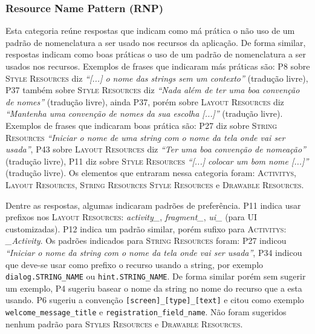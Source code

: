 \subsubsection{Resource Name Pattern (RNP)}
Esta categoria re\'une respostas que indicam como m\'a pr\'atica o n\~ao uso de um padr\~ao de nomenclatura a ser usado nos recursos da aplica\c{c}\~ao. De forma similar, respostas indicam como boas pr\'aticas o uso de um padr\~ao de nomenclatura a ser usados nos recursos. Exemplos de frases que indicaram m\'as pr\'aticas s\~ao: P8 sobre \textsc{Style Resources} diz \textit{``[...] o nome das strings sem um contexto''} (tradu\c{c}\~ao livre), P37 tamb\'em sobre \textsc{Style Resources} diz \textit{``Nada al\'em de ter uma boa conven\c{c}\~ao de nomes''} (tradu\c{c}\~ao livre), ainda P37, por\'em sobre \textsc{Layout Resources} diz \textit{``Mantenha uma conven\c{c}\~ao de nomes da sua escolha [...]''} (tradu\c{c}\~ao livre). Exemplos de frases que indicaram boas pr\'atica s\~ao: P27 diz sobre \textsc{String Resources} \textit{``Iniciar o nome de uma string com o nome da tela onde vai ser usada''}, P43 sobre \textsc{Layout Resources} diz \textit{``Ter uma boa conven\c{c}\~ao de nomea\c{c}\~ao''} (tradu\c{c}\~ao livre), P11 diz sobre \textsc{Style Resources} \textit{``[...] colocar um bom nome [...]''} (tradu\c{c}\~ao livre). Os elementos que entraram nessa categoria foram: \textsc{Activitys}, \textsc{Layout Resources}, \textsc{String Resources} \textsc{Style Resources} e \textsc{Drawable Resources}. 

Dentre as respostas, algumas indicaram padr\~oes de prefer\^encia. P11 indica usar prefixos nos \textsc{Layout Resources}: \textit{activity\_}, \textit{fragment\_}, \textit{ui\_} (para UI customizadas). P12 indica um padr\~ao similar, por\'em sufixo para \textsc{Activitys}: \textit{\_Activity}. Os padr\~oes indicados para \textsc{String Resources} foram: P27 indicou \textit{``Iniciar o nome da string com o nome da tela onde vai ser usada''}, P34 indicou que deve-se usar como prefixo o recurso usando a string, por exemplo \texttt{dialog.STRING\_NAME} ou \texttt{hint.STRING\_NAME}. De forma similar por\'em sem sugerir um exemplo, P4 sugeriu basear o nome da string no nome do recurso que a esta usando. P6 sugeriu a conven\c{c}\~ao \texttt{[screen]\_[type]\_[text]} e citou como exemplo \texttt{welcome\_message\_title} e \texttt{registration\_field\_name}. N\~ao foram sugeridos nenhum padr\~ao para \textsc{Styles Resources} e \textsc{Drawable Resources}.















